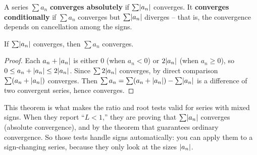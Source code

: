 \begin{definition}
\label{ch29:def-absolute}
A series $\sum a_n$ \textbf{converges absolutely} if $\sum \lvert a_n\rvert$ converges. It \textbf{converges conditionally} if $\sum a_n$ converges but $\sum \lvert a_n\rvert$ diverges -- that is, the convergence depends on cancellation among the signs.
\end{definition}

\begin{theorem}
\label{ch29:thm-abs-implies}
If $\sum \lvert a_n\rvert$ converges, then $\sum a_n$ converges.
\end{theorem}

\begin{proof}
Each $a_n + \lvert a_n\rvert$ is either $0$ (when $a_n<0$) or $2\lvert a_n\rvert$ (when $a_n \ge 0$), so $0 \le a_n + \lvert a_n\rvert \le 2\lvert a_n\rvert$. Since $\sum 2\lvert a_n\rvert$ converges, by direct comparison $\sum (a_n + \lvert a_n\rvert)$ converges. Then $\sum a_n = \sum (a_n + \lvert a_n\rvert) - \sum \lvert a_n\rvert$ is a difference of two convergent series, hence converges.
\end{proof}

\begin{focusbox}
This theorem is what makes the ratio and root tests valid for series with mixed signs. When they report ``$L<1$,'' they are proving that $\sum\lvert a_n\rvert$ converges (absolute convergence), and by the theorem that guarantees ordinary convergence. So those tests handle signs automatically: you can apply them to a sign-changing series, because they only look at the sizes $\lvert a_n\rvert$.
\end{focusbox}

